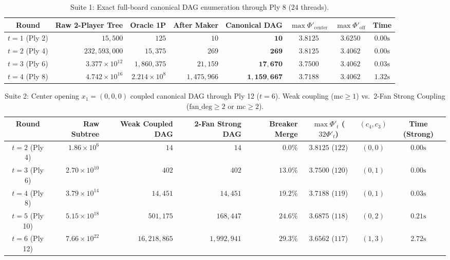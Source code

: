\documentclass[11pt,a4paper]{article}
\theoremstyle{definition}
\theoremstyle{remark}
\begin{document}
\begin{table}[ht!]
\centering
\caption{Suite 1: Exact full-board canonical DAG enumeration through Ply 8 ($24$ threads).}
\label{tab:full_dag}
\begin{tabular}{crrrrccc}
\toprule
\textbf{Round} & \textbf{Raw 2-Player Tree} & \textbf{Oracle 1P} & \textbf{After Maker} & \textbf{Canonical DAG} & $\max \Phi'_{\mathrm{center}}$ & $\max \Phi'_{\mathrm{off}}$ & \textbf{Time} \\
\midrule
$t=1$ (Ply 2) & $15,500$                    & $125$       & $10$        & $\mathbf{10}$        & $3.8125$ & $3.6250$ & $0.00\text{s}$ \\
$t=2$ (Ply 4) & $232,593,000$               & $15,375$    & $269$       & $\mathbf{269}$       & $3.8125$ & $3.4062$ & $0.00\text{s}$ \\
$t=3$ (Ply 6) & $3.377 \times 10^{12}$      & $1,860,375$ & $21,159$    & $\mathbf{17,670}$    & $3.7500$ & $3.4062$ & $0.03\text{s}$ \\
$t=4$ (Ply 8) & $4.742 \times 10^{16}$      & $2.214 \times 10^8$ & $1,475,966$ & $\mathbf{1,159,667}$ & $3.7188$ & $3.4062$ & $1.32\text{s}$ \\
\bottomrule
\end{tabular}
\end{table}

\begin{table}[ht!]
\centering
\caption{Suite 2: Center opening $x_1 = (0,0,0)$ coupled canonical DAG through Ply 12 ($t=6$). Weak coupling ($\text{mc} \ge 1$) vs.\ 2-Fan Strong Coupling ($\text{fan\_deg} \ge 2$ or $\text{mc} \ge 2$).}
\label{tab:center_dag}
\begin{tabular}{crrrrccc}
\toprule
\textbf{Round} & \textbf{Raw Subtree} & \textbf{Weak Coupled DAG} & \textbf{2-Fan Strong DAG} & \textbf{Breaker Merge} & $\max \Phi'_t$ ($32\Phi'_t$) & $(c_4, c_3)$ & \textbf{Time (Strong)} \\
\midrule
$t=2$ (Ply 4)  & $1.86 \times 10^6$    & $14$         & $14$        & $0.0\%$  & $3.8125$ ($122$) & $(0,0)$ & $0.00\text{s}$ \\
$t=3$ (Ply 6)  & $2.70 \times 10^{10}$ & $402$        & $402$       & $13.0\%$ & $3.7500$ ($120$) & $(0,1)$ & $0.00\text{s}$ \\
$t=4$ (Ply 8)  & $3.79 \times 10^{14}$ & $14,451$     & $14,451$    & $19.2\%$ & $3.7188$ ($119$) & $(0,1)$ & $0.03\text{s}$ \\
$t=5$ (Ply 10) & $5.15 \times 10^{18}$ & $501,175$    & $168,447$   & $24.6\%$ & $3.6875$ ($118$) & $(0,2)$ & $0.21\text{s}$ \\
$t=6$ (Ply 12) & $7.66 \times 10^{22}$ & $16,218,865$ & $1,992,941$ & $29.3\%$ & $3.6562$ ($117$) & $(1,3)$ & $2.72\text{s}$ \\
\bottomrule
\end{tabular}
\end{table}
\end{document}
